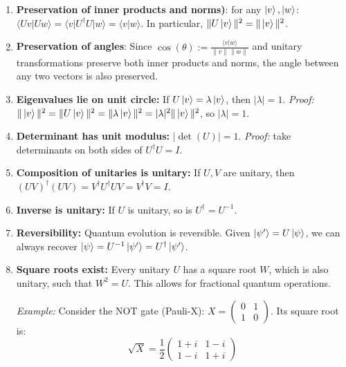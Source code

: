 \begin{proposition}\hfill
\begin{enumerate}
\item \textbf{Preservation of inner products and norms)}: for any $\ket{v}, \ket{w}$:
$\langle Uv | Uw \rangle = \langle v | U^\dagger U | w \rangle = \langle v | w \rangle$. In particular, $\|U\ket{v}\|^2 = \|\ket{v}\|^2$.

\item \textbf{Preservation of angles}: Since $\cos(\theta) := \frac{\langle v | w \rangle}{\|v\|\|w\|}$ and unitary transformations preserve both inner products and norms, the angle between any two vectors is also preserved.

\item \textbf{Eigenvalues lie on unit circle:} If $U\ket{v} = \lambda\ket{v}$, then $|\lambda| = 1$.
\textit{Proof:} $\|\ket{v}\|^2 = \|U\ket{v}\|^2 = \|\lambda\ket{v}\|^2 = |\lambda|^2\|\ket{v}\|^2$, so $|\lambda| = 1$.

\item \textbf{Determinant has unit modulus:} $|\det(U)| = 1$. \textit{Proof:} take determinants on both sides of $U^\dag U=I$.

\item \textbf{Composition of unitaries is unitary:} If $U, V$ are unitary, then $(UV)^\dagger(UV) = V^\dagger U^\dagger U V = V^\dagger V = I$.

\item \textbf{Inverse is unitary:} If $U$ is unitary, so is $U^\dagger = U^{-1}$.

\item \textbf{Reversibility:} Quantum evolution is reversible. Given $\ket{\psi'} = U\ket{\psi}$, we can always recover $\ket{\psi} = U^{-1}\ket{\psi'}= U^\dagger\ket{\psi'}$.

\item \textbf{Square roots exist:} Every unitary $U$ has a square root $W$, which is also unitary, such that $W^2 = U$. This allows for fractional quantum operations.

\textit{Example:} Consider the NOT gate (Pauli-X): $X = \begin{pmatrix} 0 & 1 \\ 1 & 0 \end{pmatrix}$. Its square root is:
$$\sqrt{X} = \frac{1}{2}\begin{pmatrix} 1+i & 1-i \\ 1-i & 1+i \end{pmatrix}$$


\end{enumerate}
\end{proposition}
